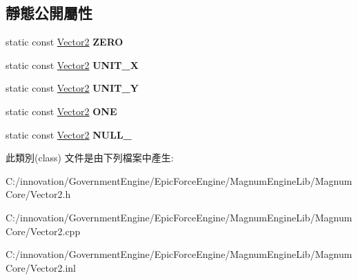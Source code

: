 \subsection*{靜態公開屬性}
\begin{DoxyCompactItemize}
\item 
static const \hyperlink{class_i_dream_sky_1_1_vector2}{Vector2} {\bfseries Z\+E\+RO}\hypertarget{class_i_dream_sky_1_1_vector2_aa229b967fdb213d19a76e8ea588e53a0}{}\label{class_i_dream_sky_1_1_vector2_aa229b967fdb213d19a76e8ea588e53a0}

\item 
static const \hyperlink{class_i_dream_sky_1_1_vector2}{Vector2} {\bfseries U\+N\+I\+T\+\_\+X}\hypertarget{class_i_dream_sky_1_1_vector2_a8f4a2342388bfc0dff6cb2627d45850f}{}\label{class_i_dream_sky_1_1_vector2_a8f4a2342388bfc0dff6cb2627d45850f}

\item 
static const \hyperlink{class_i_dream_sky_1_1_vector2}{Vector2} {\bfseries U\+N\+I\+T\+\_\+Y}\hypertarget{class_i_dream_sky_1_1_vector2_accae044323c93c9ceaaefe4a69cca49d}{}\label{class_i_dream_sky_1_1_vector2_accae044323c93c9ceaaefe4a69cca49d}

\item 
static const \hyperlink{class_i_dream_sky_1_1_vector2}{Vector2} {\bfseries O\+NE}\hypertarget{class_i_dream_sky_1_1_vector2_a68c2674df24c6502a66e3db99efe34b7}{}\label{class_i_dream_sky_1_1_vector2_a68c2674df24c6502a66e3db99efe34b7}

\item 
static const \hyperlink{class_i_dream_sky_1_1_vector2}{Vector2} {\bfseries N\+U\+L\+L\+\_\+}\hypertarget{class_i_dream_sky_1_1_vector2_a350d1b19b792d74bc344fb1be006cd5f}{}\label{class_i_dream_sky_1_1_vector2_a350d1b19b792d74bc344fb1be006cd5f}

\end{DoxyCompactItemize}


此類別(class) 文件是由下列檔案中產生\+:\begin{DoxyCompactItemize}
\item 
C\+:/innovation/\+Government\+Engine/\+Epic\+Force\+Engine/\+Magnum\+Engine\+Lib/\+Magnum\+Core/Vector2.\+h\item 
C\+:/innovation/\+Government\+Engine/\+Epic\+Force\+Engine/\+Magnum\+Engine\+Lib/\+Magnum\+Core/Vector2.\+cpp\item 
C\+:/innovation/\+Government\+Engine/\+Epic\+Force\+Engine/\+Magnum\+Engine\+Lib/\+Magnum\+Core/Vector2.\+inl\end{DoxyCompactItemize}
